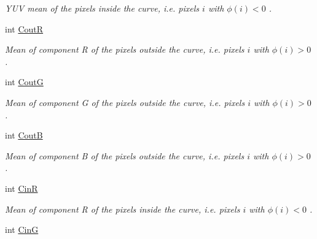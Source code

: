 \begin{DoxyCompactItemize}
\begin{DoxyCompactList}\small\item\em Y\-U\-V mean of the pixels inside the curve, i.\-e. pixels $i$ with $\phi \left( i\right) <0$ . \end{DoxyCompactList}\item 
\hypertarget{classofeli_1_1_a_cwithout_edges_y_u_v_a6d5f27cda390c51891165958613a0e19}{int \hyperlink{classofeli_1_1_a_cwithout_edges_y_u_v_a6d5f27cda390c51891165958613a0e19}{Cout\-R}}\label{classofeli_1_1_a_cwithout_edges_y_u_v_a6d5f27cda390c51891165958613a0e19}

\begin{DoxyCompactList}\small\item\em Mean of component {\itshape R} of the pixels outside the curve, i.\-e. pixels $i$ with $\phi \left( i\right) >0$ . \end{DoxyCompactList}\item 
\hypertarget{classofeli_1_1_a_cwithout_edges_y_u_v_a7204eb013515fad29ae5248219803225}{int \hyperlink{classofeli_1_1_a_cwithout_edges_y_u_v_a7204eb013515fad29ae5248219803225}{Cout\-G}}\label{classofeli_1_1_a_cwithout_edges_y_u_v_a7204eb013515fad29ae5248219803225}

\begin{DoxyCompactList}\small\item\em Mean of component {\itshape G} of the pixels outside the curve, i.\-e. pixels $i$ with $\phi \left( i\right) >0$ . \end{DoxyCompactList}\item 
\hypertarget{classofeli_1_1_a_cwithout_edges_y_u_v_a74c6d6e79c6360ff67fa6402b44ddfc8}{int \hyperlink{classofeli_1_1_a_cwithout_edges_y_u_v_a74c6d6e79c6360ff67fa6402b44ddfc8}{Cout\-B}}\label{classofeli_1_1_a_cwithout_edges_y_u_v_a74c6d6e79c6360ff67fa6402b44ddfc8}

\begin{DoxyCompactList}\small\item\em Mean of component {\itshape B} of the pixels outside the curve, i.\-e. pixels $i$ with $\phi \left( i\right) >0$ . \end{DoxyCompactList}\item 
\hypertarget{classofeli_1_1_a_cwithout_edges_y_u_v_a530187c61ecd52f7205c31092717adbd}{int \hyperlink{classofeli_1_1_a_cwithout_edges_y_u_v_a530187c61ecd52f7205c31092717adbd}{Cin\-R}}\label{classofeli_1_1_a_cwithout_edges_y_u_v_a530187c61ecd52f7205c31092717adbd}

\begin{DoxyCompactList}\small\item\em Mean of component {\itshape R} of the pixels inside the curve, i.\-e. pixels $i$ with $\phi \left( i\right) <0$ . \end{DoxyCompactList}\item 
\hypertarget{classofeli_1_1_a_cwithout_edges_y_u_v_ac3fc93827ad0ab1513ff0b740d654106}{int \hyperlink{classofeli_1_1_a_cwithout_edges_y_u_v_ac3fc93827ad0ab1513ff0b740d654106}{Cin\-G}}\label{classofeli_1_1_a_cwithout_edges_y_u_v_ac3fc93827ad0ab1513ff0b740d654106}


\end{DoxyCompactItemize}
